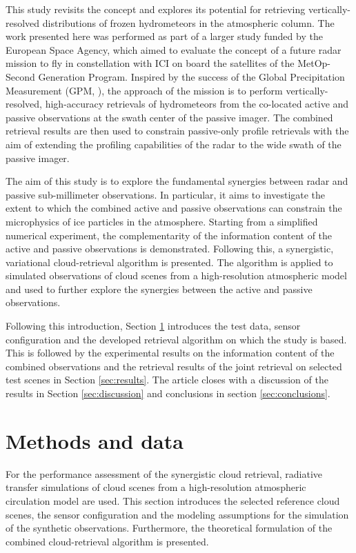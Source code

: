 \documentclass[journal abbreviation, manuscript]{copernicus}
\begin{document}
This study revisits the concept and explores its potential for retrieving
vertically-resolved distributions of frozen hydrometeors in the atmospheric
column. The work presented here was performed as part of a larger study funded
by the European Space Agency, which aimed to evaluate the concept of a future
radar mission to fly in constellation with ICI on board the satellites of the
MetOp-Second Generation Program. Inspired by the success of the Global
Precipitation Measurement (GPM, \cite{hou14}), the approach of the mission is to
perform vertically-resolved, high-accuracy retrievals of hydrometeors from the
co-located active and passive observations at the swath center of the passive
imager. The combined retrieval results are then used to constrain passive-only
profile retrievals with the aim of extending the profiling capabilities of the
radar to the wide swath of the passive imager.

The aim of this study is to explore the fundamental synergies between radar and
passive sub-millimeter observations. In particular, it aims to investigate the
extent to which the combined active and passive observations can constrain the
microphysics of ice particles in the atmosphere. Starting from a simplified
numerical experiment, the complementarity of the information content of the
active and passive observations is demonstrated. Following this, a synergistic,
variational cloud-retrieval algorithm is presented. The algorithm is applied to
simulated observations of cloud scenes from a high-resolution atmospheric model
and used to further explore the synergies between the active and passive
observations.

Following this introduction, Section \ref{sec:methods_and_data} introduces the
test data, sensor configuration and the developed retrieval algorithm on which
the study is based. This is followed by the experimental results on the
information content of the combined observations and the retrieval results of
the joint retrieval on selected test scenes in Section \ref{sec:results}. The
article closes with a discussion of the results in Section \ref{sec:discussion}
and conclusions in section \ref{sec:conclusions}.


\section{Methods and data}
\label{sec:methods_and_data}

For the performance assessment of the synergistic cloud retrieval, radiative
transfer simulations of cloud scenes from a high-resolution atmospheric
circulation model are used. This section introduces the selected reference cloud
scenes, the sensor configuration and the modeling assumptions for the simulation
of the synthetic observations. Furthermore, the theoretical formulation of the
combined cloud-retrieval algorithm is presented.
\end{document}
